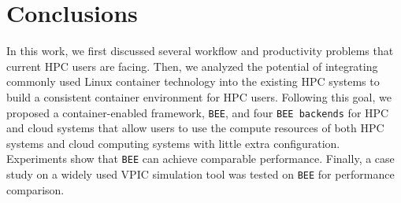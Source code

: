 \section{Conclusions}
\label{conclusions-section}
In this work, we first discussed several workflow and productivity problems that current HPC users are facing. Then, we analyzed the potential of integrating commonly used Linux container technology into the existing HPC systems to build a consistent container environment for HPC users. Following this goal, we proposed a container-enabled framework, \texttt{BEE}, and four \texttt{BEE backends} for HPC and cloud systems that allow users to use the compute resources of both HPC systems and cloud computing systems with little extra configuration. Experiments show that \texttt{BEE} can achieve comparable performance. Finally, a case study on a widely used VPIC simulation tool was tested on \texttt{BEE} for performance comparison. 
